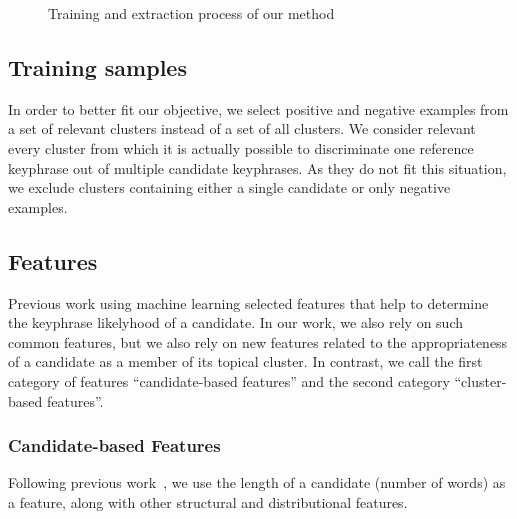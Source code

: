 \begin{figure*}
    \caption{Training and extraction process of our method
             \label{fig:topicrank_plus_svm}}
  \end{figure*}

  \subsection{Training samples}
  \label{subsec:training_samples}
    In order to better fit our objective, we select positive and negative
    examples from a set of relevant clusters instead of a set of all clusters.
    We consider relevant every cluster from which it is actually possible to
    discriminate one reference keyphrase out of multiple candidate keyphrases.
    As they do not fit this situation, we exclude clusters containing either a
    single candidate or only negative examples.

  \subsection{Features}
  \label{subsec:features}
    Previous work using machine learning selected features that help to
    determine the keyphrase likelyhood of a candidate. In our work, we also rely
    on such common features, but we also rely on new features related to the
    appropriateness of a candidate as a member of its topical cluster. In
    contrast, we call the first category of features ``candidate-based
    features'' and the second category ``cluster-based features''.

    \subsubsection{Candidate-based Features}
    \label{subsubsec:topically_independent_features}
      Following previous
      work~\cite{nguyen2007keadocumentstructure,lopez2010humb}, we use the
      length of a candidate (number of words) as a feature, along with other
      structural and distributional features.

